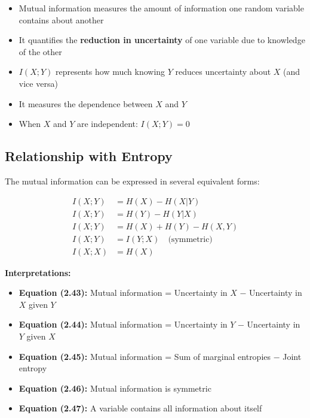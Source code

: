 \documentclass[11pt,a4paper]{book}
\newenvironment{formulabox}[1][Formula]{
    \begin{tcolorbox}[
        enhanced,
        breakable,
        colback=softcoral!10,
        colframe=softcoral!200,
        title=#1,
        fonttitle=\bfseries,
        coltitle=white,
        sharp corners,
        boxrule=1pt,
        left=8pt,
        right=8pt,
        top=6pt,
        bottom=6pt
    ]
}{
    \end{tcolorbox}
}
\newenvironment{infobox}[1][For more understanding]{
    \begin{tcolorbox}[
        enhanced,
        breakable,
        colback=mintgreen!10,
        colframe=mintgreen!200,
        title=#1,
        fonttitle=\bfseries,
        sharp corners,
        boxrule=0.8pt,
        left=8pt,
        right=8pt,
        top=6pt,
        bottom=6pt
    ]
}{
    \end{tcolorbox}
}
\begin{document}
\begin{infobox}[Interpretation of Mutual Information]
    \begin{itemize}
        \item Mutual information measures the amount of information one random variable contains about another
        \item It quantifies the \textbf{reduction in uncertainty} of one variable due to knowledge of the other
        \item \(I(X;Y)\) represents how much knowing \(Y\) reduces uncertainty about \(X\) (and vice versa)
        \item It measures the dependence between \(X\) and \(Y\)
        \item When \(X\) and \(Y\) are independent: \(I(X;Y) = 0\)
    \end{itemize}
\end{infobox}

\subsection{Relationship with Entropy}

\begin{formulabox}[Theorem 2.4.1: Mutual Information and Entropy]
    The mutual information can be expressed in several equivalent forms:
    
    \begin{align}
    I(X;Y) &= H(X) - H(X|Y) \tag{2.43}\\
    I(X;Y) &= H(Y) - H(Y|X) \tag{2.44}\\
    I(X;Y) &= H(X) + H(Y) - H(X,Y) \tag{2.45}\\
    I(X;Y) &= I(Y;X) \quad \text{(symmetric)} \tag{2.46}\\
    I(X;X) &= H(X) \tag{2.47}
    \end{align}
    
    \textbf{Interpretations:}
    \begin{itemize}
        \item \textbf{Equation (2.43):} Mutual information = Uncertainty in \(X\) − Uncertainty in \(X\) given \(Y\)
        \item \textbf{Equation (2.44):} Mutual information = Uncertainty in \(Y\) − Uncertainty in \(Y\) given \(X\)
        \item \textbf{Equation (2.45):} Mutual information = Sum of marginal entropies − Joint entropy
        \item \textbf{Equation (2.46):} Mutual information is symmetric
        \item \textbf{Equation (2.47):} A variable contains all information about itself
    \end{itemize}
\end{formulabox}
\end{document}
